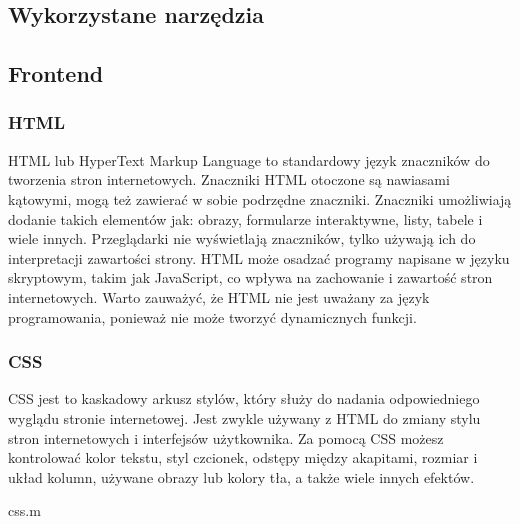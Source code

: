 \documentclass[10pt,a4paper]{report}
\begin{document}
\begin{adjustwidth}{2cm}{2cm}
\chapter{Wykorzystane narzędzia}
\section{Frontend}
\subsection{HTML}
\begin{minipage}{1\linewidth}
HTML lub HyperText Markup Language to standardowy język znaczników do tworzenia stron internetowych. Znaczniki HTML otoczone są nawiasami kątowymi, mogą też zawierać w sobie podrzędne znaczniki. Znaczniki umożliwiają dodanie takich elementów jak: obrazy, formularze interaktywne, listy, tabele i wiele innych. Przeglądarki nie wyświetlają znaczników, tylko używają ich do interpretacji zawartości strony. HTML może osadzać programy napisane w języku skryptowym, takim jak JavaScript, co wpływa na zachowanie i zawartość stron internetowych. Warto zauważyć, że HTML nie jest uważany za język programowania, ponieważ nie może tworzyć dynamicznych funkcji. 
\end{minipage}
\subsection{CSS}
\begin{minipage}{1\linewidth}
CSS jest to kaskadowy arkusz stylów, który służy do nadania odpowiedniego wyglądu stronie internetowej. Jest zwykle używany z HTML do zmiany stylu stron internetowych i interfejsów użytkownika. Za pomocą CSS możesz kontrolować kolor tekstu, styl czcionek, odstępy między akapitami, rozmiar i układ kolumn, używane obrazy lub kolory tła, a także wiele innych efektów.
\end{minipage}
\begin{center}
\begin{lstinputlisting}[ escapeinside=``,caption={\textit{Przykładowe użycie CSS w projekcie}}]
{css.m}
\end{lstinputlisting}
\end{center}
\vspace{0.1cm}

\end{adjustwidth}
\end{document}
